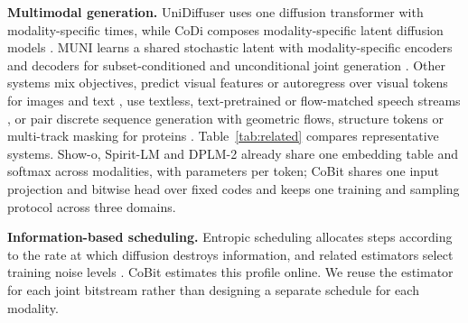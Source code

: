 \textbf{Multimodal generation.} UniDiffuser uses one diffusion transformer with modality-specific
times, while CoDi composes modality-specific latent diffusion models
\citep{bao2023unidiffuser,tang2023codi}. MUNI learns a shared stochastic latent with modality-specific encoders and decoders for subset-conditioned and unconditional joint generation \citep{yeo2026muni}. Other systems mix objectives, predict visual features or autoregress over visual tokens for images and text \citep{image:showo,image:seedx,image:lwm}, use textless, text-pretrained or flow-matched speech streams \citep{audio:audiolm,audio:twist,audio:spirit-lm,audio:moshi,audio:taste,audio:flow-slm}, or pair discrete sequence generation with geometric flows, structure tokens or multi-track masking for proteins \citep{campbell2024multiflow,wang2025dplm2,protein:esm3}. Table~\ref{tab:related} compares representative systems. Show-o, Spirit-LM and DPLM-2 already share one embedding table and softmax across modalities, with parameters per token; CoBit shares one input projection and bitwise head over fixed codes and keeps one training and sampling protocol across three domains.

\textbf{Information-based scheduling.} Entropic scheduling allocates steps according to the rate
at which diffusion destroys information, and related estimators select training noise levels
\citep{stancevic2025entropic,raya2026infonoise,trentini2026entropybridgeconditionalmarginaldiscretization}.
CoBit estimates this profile online. We reuse the estimator for each joint bitstream rather than
designing a separate schedule for each modality.
